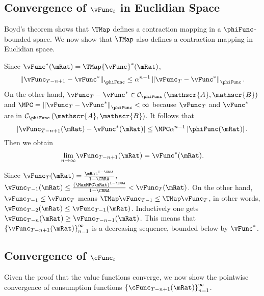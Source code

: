 \documentclass[titlepage]{\econtex}\providecommand{\texname}{BufferStockTheory}%
\begin{document}
\subsection{Convergence of $\vFunc_{t}$ in Euclidian Space}\label{sec:vEuclidian}

Boyd's theorem shows that $\TMap$ defines a contraction mapping
in a $\phiFunc$-bounded space. We now show that $\TMap$ also
defines a contraction mapping in Euclidian space.

Since $\vFunc^{\ast }(\mRat)=\TMap {\vFunc}^{\ast }(\mRat)$,
\begin{equation}
\left\Vert \vFunc_{T-n+1}-\vFunc^{\ast }\right\Vert _{\phiFunc }\leq \Shrinker
^{n-1}\left\Vert \vFunc_{T}-\vFunc^{\ast }\right\Vert _{\phiFunc }.
\end{equation}%
On the other hand, $\vFunc_{T}-\vFunc^{\ast }\in \mathcal{C}_{\phiFunc }\left( \mathscr{A},
\mathscr{B}\right) $ and $\MPC =\left\Vert \vFunc_{T}-\vFunc^{\ast }\right\Vert_{\phiFunc }<\infty $ because $\vFunc_{T}$ and $\vFunc^{\ast }$ are in $\mathcal{C}_{\phiFunc
}\left( \mathscr{A},\mathscr{B}\right) $. It follows that%
\begin{equation}
\left\vert \vFunc_{T-n+1}(\mRat)-\vFunc^{\ast }(\mRat)\right\vert \leq \MPC \Shrinker^{n-1}\left\vert \phiFunc(\mRat)\right\vert.
\end{equation}%
Then we obtain
\begin{equation}
\underset{n\rightarrow \infty }{\lim }\vFunc_{T-n+1}(\mRat)=\vFunc^{\ast }(\mRat).
\end{equation}

Since $\vFunc_{T}(\mRat)=\frac{\mRat^{1-\CRRA }}{1-\CRRA }$, $\vFunc_{T-1}(\mRat)\leq \frac{\left(\MaxMPC \mRat\right)^{1-\CRRA}}{1-\CRRA}<\vFunc_{T}(\mRat)$. On the other hand, $\vFunc_{T-1}\leq \vFunc_{T}$
means $\TMap\vFunc_{T-1}\leq \TMap\vFunc_{T}$, in other words, $\vFunc_{T-2}(\mRat)\leq \vFunc_{T-1}(\mRat)$.
Inductively one gets $\vFunc_{T-n}(\mRat)\geq \vFunc_{T-n-1}(\mRat)$. This means that $\left\{
\vFunc_{T-n+1}(\mRat)\right\} _{n=1}^{\infty }$ is a decreasing sequence,
bounded below by $\vFunc^{\ast}$.


\subsection{Convergence of $\cFunc_{t}$}\label{sec:cConverges}\label{sec:cEuclidian}

Given the proof that the value functions converge, we now show the
pointwise convergence of consumption functions
$\left\{\cFunc_{T-n+1}(\mRat)\right\} _{n=1}^{\infty }$.
\end{document}
